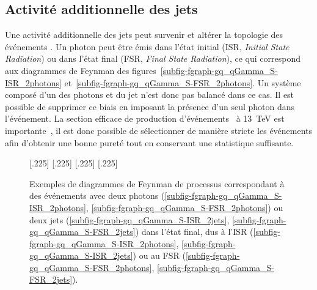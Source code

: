 \subsection{Activité additionnelle des jets}\label{chapter-HLO-section-pheno-GJets-subsec-effets_radiatifs}
Une activité additionnelle des jets peut survenir et altérer la topologie des événements \Gjets.
Un photon peut être émis dans l'état initial (ISR, \emph{Initial State Radiation}) ou dans l'état final (FSR, \emph{Final State Radiation}), ce qui correspond aux diagrammes de Feynman des figures~\ref{subfig-fgraph-gq_qGamma_S-ISR_2photons} et~\ref{subfig-fgraph-gq_qGamma_S-FSR_2photons}.
Un système composé d'un des photons et du jet n'est donc pas balancé dans ce cas.
Il est possible de supprimer ce biais en imposant la présence d'un seul photon dans l'événement.
La section efficace de production d'événements \Gjets\ à \SI{13}{\TeV} est importante~\cite{Gjet_xsec_2018}, il est donc possible de sélectionner de manière stricte les événements afin d'obtenir une bonne pureté tout en conservant une statistique suffisante.
\begin{figure}[h]
\centering\vspace{\baselineskip}
\subcaptionbox{\label{subfig-fgraph-gq_qGamma_S-ISR_2photons}}[.225\textwidth]
{\vspace{\baselineskip}}
\hfill
\subcaptionbox{\label{subfig-fgraph-gq_qGamma_S-FSR_2photons}}[.225\textwidth]
{\vspace{\baselineskip}}
\hfill
\subcaptionbox{\label{subfig-fgraph-gq_qGamma_S-ISR_2jets}}[.225\textwidth]
{\vspace{\baselineskip}}
\hfill
\subcaptionbox{\label{subfig-fgraph-gq_qGamma_S-FSR_2jets}}[.225\textwidth]
{\vspace{\baselineskip}}
\caption[Diagrammes de Feynman de processus avec ISR ou FSR.]{Exemples de diagrammes de Feynman de processus correspondant à des événements avec deux photons (\ref{subfig-fgraph-gq_qGamma_S-ISR_2photons}, \ref{subfig-fgraph-gq_qGamma_S-FSR_2photons}) ou deux jets (\ref{subfig-fgraph-gq_qGamma_S-ISR_2jets}, \ref{subfig-fgraph-gq_qGamma_S-FSR_2jets}) dans l'état final, dus à l'ISR (\ref{subfig-fgraph-gq_qGamma_S-ISR_2photons}, \ref{subfig-fgraph-gq_qGamma_S-ISR_2jets}) ou au FSR (\ref{subfig-fgraph-gq_qGamma_S-FSR_2photons}, \ref{subfig-fgraph-gq_qGamma_S-FSR_2jets}).}
\label{fig-fgraph-gamma_plus_jets-ISR-FSR}
\end{figure}
